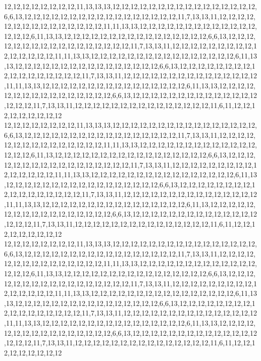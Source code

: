 12,12,12,12,12,12,12,12,11,13,13,13,12,12,12,12,12,12,12,12,12,12,12,12,12,12,12,12,6,6,13,12,12,12,12,12,12,12,12,12,12,12,12,12,12,12,12,12,11,7,13,13,11,12,12,12,12,12,12,12,12,12,12,12,12,12,12,12,11,11,13,13,12,12,12,12,12,12,12,12,12,12,12,12,12,12,12,12,6,11,13,13,12,12,12,12,12,12,12,12,12,12,12,12,12,12,12,12,6,6,13,12,12,12,12,12,12,12,12,12,12,12,12,12,12,12,12,12,11,7,13,13,11,12,12,12,12,12,12,12,12,12,12,12,12,12,12,12,11,11,13,13,12,12,12,12,12,12,12,12,12,12,12,12,12,12,12,12,6,11,13,13,12,12,12,12,12,12,12,12,12,12,12,12,12,12,12,12,6,6,13,12,12,12,12,12,12,12,12,12,12,12,12,12,12,12,12,12,11,7,13,13,11,12,12,12,12,12,12,12,12,12,12,12,12,12,12,12,11,11,13,13,12,12,12,12,12,12,12,12,12,12,12,12,12,12,12,12,6,11,13,13,12,12,12,12,12,12,12,12,12,12,12,12,12,12,12,12,6,6,13,12,12,12,12,12,12,12,12,12,12,12,12,12,12,12,12,12,11,7,13,13,11,12,12,12,12,12,12,12,12,12,12,12,12,12,12,12,11,6,11,12,12,12,12,12,12,12,12,12
12,12,12,12,12,12,12,12,11,13,13,13,12,12,12,12,12,12,12,12,12,12,12,12,12,12,12,12,6,6,13,12,12,12,12,12,12,12,12,12,12,12,12,12,12,12,12,12,11,7,13,13,11,12,12,12,12,12,12,12,12,12,12,12,12,12,12,12,11,11,13,13,12,12,12,12,12,12,12,12,12,12,12,12,12,12,12,12,6,11,13,12,12,12,12,12,12,12,12,12,12,12,12,12,12,12,12,12,6,6,13,12,12,12,12,12,12,12,12,12,12,12,12,12,12,12,12,12,11,7,13,13,11,12,12,12,12,12,12,12,12,12,12,12,12,12,12,12,11,11,13,13,12,12,12,12,12,12,12,12,12,12,12,12,12,12,12,12,6,11,13,12,12,12,12,12,12,12,12,12,12,12,12,12,12,12,12,12,6,6,13,12,12,12,12,12,12,12,12,12,12,12,12,12,12,12,12,12,11,7,13,13,11,12,12,12,12,12,12,12,12,12,12,12,12,12,12,12,11,11,13,13,12,12,12,12,12,12,12,12,12,12,12,12,12,12,12,12,6,11,13,12,12,12,12,12,12,12,12,12,12,12,12,12,12,12,12,12,6,6,13,12,12,12,12,12,12,12,12,12,12,12,12,12,12,12,12,12,11,7,13,13,11,12,12,12,12,12,12,12,12,12,12,12,12,12,12,12,11,6,11,12,12,12,12,12,12,12,12,12
12,12,12,12,12,12,12,12,11,13,13,13,12,12,12,12,12,12,12,12,12,12,12,12,12,12,12,12,6,6,13,12,12,12,12,12,12,12,12,12,12,12,12,12,12,12,12,12,11,7,13,13,11,12,12,12,12,12,12,12,12,12,12,12,12,12,12,12,11,11,13,13,12,12,12,12,12,12,12,12,12,12,12,12,12,12,12,12,6,11,13,13,12,12,12,12,12,12,12,12,12,12,12,12,12,12,12,12,6,6,13,12,12,12,12,12,12,12,12,12,12,12,12,12,12,12,12,12,11,7,13,13,11,12,12,12,12,12,12,12,12,12,12,12,12,12,12,12,11,11,13,13,12,12,12,12,12,12,12,12,12,12,12,12,12,12,12,12,6,11,13,13,12,12,12,12,12,12,12,12,12,12,12,12,12,12,12,12,6,6,13,12,12,12,12,12,12,12,12,12,12,12,12,12,12,12,12,12,11,7,13,13,11,12,12,12,12,12,12,12,12,12,12,12,12,12,12,12,11,11,13,13,12,12,12,12,12,12,12,12,12,12,12,12,12,12,12,12,6,11,13,13,12,12,12,12,12,12,12,12,12,12,12,12,12,12,12,12,6,6,13,12,12,12,12,12,12,12,12,12,12,12,12,12,12,12,12,12,11,7,13,13,11,12,12,12,12,12,12,12,12,12,12,12,12,12,12,12,11,6,11,12,12,12,12,12,12,12,12,12
